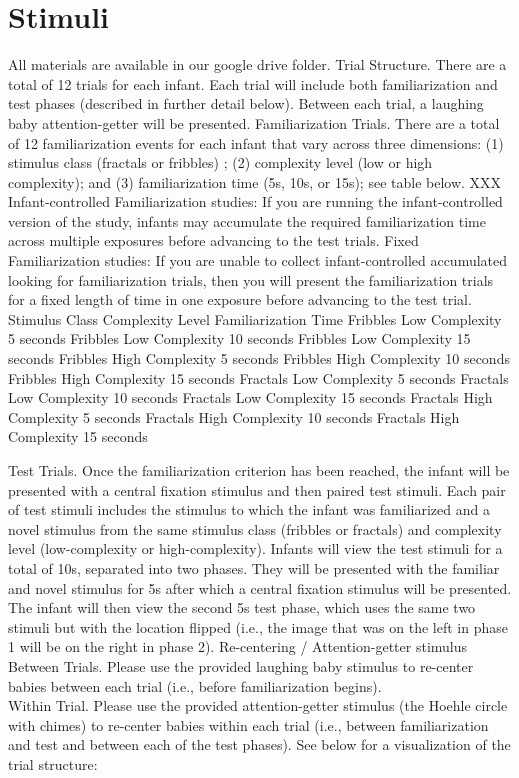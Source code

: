 \documentclass[
]{book}
\begin{document}
\hypertarget{stimuli}{%
\section{Stimuli}\label{stimuli}}

All materials are available in our google drive folder.
Trial Structure. There are a total of 12 trials for each infant. Each trial will include both familiarization and test phases (described in further detail below). Between each trial, a laughing baby attention-getter will be presented.
Familiarization Trials. There are a total of 12 familiarization events for each infant that vary across three dimensions: (1) stimulus class (fractals or fribbles) ; (2) complexity level (low or high complexity); and (3) familiarization time (5s, 10s, or 15s); see table below. XXX
Infant-controlled Familiarization studies: If you are running the infant-controlled version of the study, infants may accumulate the required familiarization time across multiple exposures before advancing to the test trials.
Fixed Familiarization studies: If you are unable to collect infant-controlled accumulated looking for familiarization trials, then you will present the familiarization trials for a fixed length of time in one exposure before advancing to the test trial.
Stimulus Class
Complexity Level
Familiarization Time
Fribbles
Low Complexity
5 seconds
Fribbles
Low Complexity
10 seconds
Fribbles
Low Complexity
15 seconds
Fribbles
High Complexity
5 seconds
Fribbles
High Complexity
10 seconds
Fribbles
High Complexity
15 seconds
Fractals
Low Complexity
5 seconds
Fractals
Low Complexity
10 seconds
Fractals
Low Complexity
15 seconds
Fractals
High Complexity
5 seconds
Fractals
High Complexity
10 seconds
Fractals
High Complexity
15 seconds

Test Trials. Once the familiarization criterion has been reached, the infant will be presented with a central fixation stimulus and then paired test stimuli. Each pair of test stimuli includes the stimulus to which the infant was familiarized and a novel stimulus from the same stimulus class (fribbles or fractals) and complexity level (low-complexity or high-complexity). Infants will view the test stimuli for a total of 10s, separated into two phases. They will be presented with the familiar and novel stimulus for 5s after which a central fixation stimulus will be presented. The infant will then view the second 5s test phase, which uses the same two stimuli but with the location flipped (i.e., the image that was on the left in phase 1 will be on the right in phase 2).
Re-centering / Attention-getter stimulus
Between Trials. Please use the provided laughing baby stimulus to re-center babies between each trial (i.e., before familiarization begins).\\
Within Trial. Please use the provided attention-getter stimulus (the Hoehle circle with chimes) to re-center babies within each trial (i.e., between familiarization and test and between each of the test phases).
See below for a visualization of the trial structure:
\end{document}
